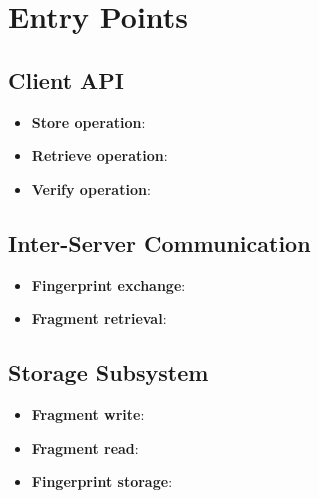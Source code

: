 \documentclass[../veristore_security_model.tex]{subfiles}
\begin{document}
\section{Entry Points}


\subsection{Client API}

\begin{itemize}
    \item \textbf{Store operation}: %
    \item \textbf{Retrieve operation}: %
    \item \textbf{Verify operation}: %
\end{itemize}

\subsection{Inter-Server Communication}

\begin{itemize}
    \item \textbf{Fingerprint exchange}: %
    \item \textbf{Fragment retrieval}: %
\end{itemize}

\subsection{Storage Subsystem}

\begin{itemize}
    \item \textbf{Fragment write}: %
    \item \textbf{Fragment read}: %
    \item \textbf{Fingerprint storage}: %
\end{itemize}

\newpage
\end{document}
